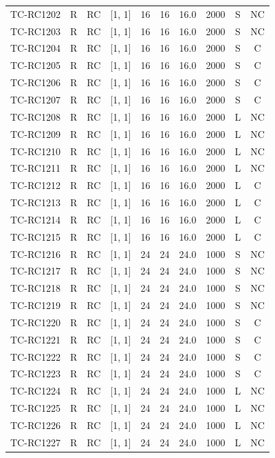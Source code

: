 \begin{longtable}{lccccccccc}
TC-RC1202 & R & RC & [1, 1] & 16 & 16 & 16.0 & 2000 & S & NC \\
TC-RC1203 & R & RC & [1, 1] & 16 & 16 & 16.0 & 2000 & S & NC \\
TC-RC1204 & R & RC & [1, 1] & 16 & 16 & 16.0 & 2000 & S & C \\
TC-RC1205 & R & RC & [1, 1] & 16 & 16 & 16.0 & 2000 & S & C \\
TC-RC1206 & R & RC & [1, 1] & 16 & 16 & 16.0 & 2000 & S & C \\
TC-RC1207 & R & RC & [1, 1] & 16 & 16 & 16.0 & 2000 & S & C \\
TC-RC1208 & R & RC & [1, 1] & 16 & 16 & 16.0 & 2000 & L & NC \\
TC-RC1209 & R & RC & [1, 1] & 16 & 16 & 16.0 & 2000 & L & NC \\
TC-RC1210 & R & RC & [1, 1] & 16 & 16 & 16.0 & 2000 & L & NC \\
TC-RC1211 & R & RC & [1, 1] & 16 & 16 & 16.0 & 2000 & L & NC \\
TC-RC1212 & R & RC & [1, 1] & 16 & 16 & 16.0 & 2000 & L & C \\
TC-RC1213 & R & RC & [1, 1] & 16 & 16 & 16.0 & 2000 & L & C \\
TC-RC1214 & R & RC & [1, 1] & 16 & 16 & 16.0 & 2000 & L & C \\
TC-RC1215 & R & RC & [1, 1] & 16 & 16 & 16.0 & 2000 & L & C \\
TC-RC1216 & R & RC & [1, 1] & 24 & 24 & 24.0 & 1000 & S & NC \\
TC-RC1217 & R & RC & [1, 1] & 24 & 24 & 24.0 & 1000 & S & NC \\
TC-RC1218 & R & RC & [1, 1] & 24 & 24 & 24.0 & 1000 & S & NC \\
TC-RC1219 & R & RC & [1, 1] & 24 & 24 & 24.0 & 1000 & S & NC \\
TC-RC1220 & R & RC & [1, 1] & 24 & 24 & 24.0 & 1000 & S & C \\
TC-RC1221 & R & RC & [1, 1] & 24 & 24 & 24.0 & 1000 & S & C \\
TC-RC1222 & R & RC & [1, 1] & 24 & 24 & 24.0 & 1000 & S & C \\
TC-RC1223 & R & RC & [1, 1] & 24 & 24 & 24.0 & 1000 & S & C \\
TC-RC1224 & R & RC & [1, 1] & 24 & 24 & 24.0 & 1000 & L & NC \\
TC-RC1225 & R & RC & [1, 1] & 24 & 24 & 24.0 & 1000 & L & NC \\
TC-RC1226 & R & RC & [1, 1] & 24 & 24 & 24.0 & 1000 & L & NC \\
TC-RC1227 & R & RC & [1, 1] & 24 & 24 & 24.0 & 1000 & L & NC \\

\end{longtable}
